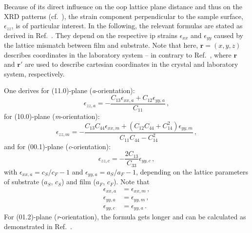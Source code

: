 Because of its direct influence on the \gls{oop} lattice plane distance and thus on the \gls{XRD} patterns (cf.~\tbd), the strain component perpendicular to the sample surface, $\epsilon_{zz}$, is of particular interest. %
In the following, the relevant formulas are stated as derived in Ref.~\cite{grundmann2018}.
They depend on the respective \gls{ip} strains $\epsilon_{xx}$ and $\epsilon_{yy}$ caused by the lattice mismatch between film and substrate.
Note that here, $\mathbf{r}=(x,y,z)$ describes coordinates in the laboratory system -- in contrary to Ref.~\cite{grundmann2018}, where $\mathbf{r}$ and $\mathbf{r}'$ are used to describe cartesian coordinates in the crystal and laboratory system, respectively.

One derives for (11.0)-plane (\textit{a}-orientation):
\begin{equation}
    \label{euq:e3-a}
    \epsilon_{zz,a}=-\frac{C_{13}\epsilon_{xx,a}+C_{12}\epsilon_{yy,a}}{C_{11}} \,,
\end{equation}
for (10.0)-plane (\textit{m}-orientation):
\begin{equation}
    \label{euq:e3-m}
    \epsilon_{zz,m}=-\frac{C_{13}C_{44}\epsilon_{xx,m}+(C_{12}C_{44}+C_{14}^2)\epsilon_{yy,m}}{C_{11}C_{44}-C_{14}^2} \,,
\end{equation}
and for (00.1)-plane (\textit{c}-orientation):
\begin{equation}
    \label{euq:e3-c}
    \epsilon_{zz,c}=-\frac{2C_{13}}{C_{33}}\epsilon_{yy,c} \,,
\end{equation}
with $\epsilon_{xx,a}=c_S/c_F-1$ and $\epsilon_{yy,a}=a_S/a_F-1$, depending on the lattice parameters of substrate ($a_S$, $c_S$) and film ($a_F$, $c_F$).
Note that 
\begin{align*}
    \epsilon_{xx,a}&= \epsilon_{xx,m}\,,\\
    \epsilon_{yy,a}&= \epsilon_{yy,m}\,,\\
    \epsilon_{yy,c}&= \epsilon_{yy,a}\,.
\end{align*}
For (01.2)-plane (\textit{r}-orientation), the formula gets longer and can be calculated as demonstrated in Ref.~\cite{grundmann2020}.

